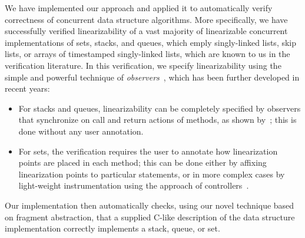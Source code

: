 We have implemented our approach and applied it to automatically verify
correctness of concurrent data structure algorithms.
More specifically, we have successfully verified linearizability of 
a vast majority of linearizable concurrent implementations
of sets, stacks, and queues, which emply singly-linked lists, skip lists, or
arrays of timestamped singly-linked lists, which are known to us in
the verification literature. In this verification, we specify linearizability
using the simple and powerful technique of
{\em observers}~\cite{AHHR:integrated}, which has been further developed in
recent years:
\begin{itemize}
\item
  For stacks and queues, linearizability can be completely specified by
  observers that synchronize on call and return actions of
  methods, as shown by~\cite{BEEH:icalp15,HSV:concur13}; this is done without
 any user annotation.
\item
  For sets, the verification requires the user to annotate how linearization
  points are placed in each method; this can be done either by affixing
  linearization points to particular statements, or in more complex cases by
  light-weight instrumentation using the approach of
  controllers~\cite{Quy:sas16}.
\end{itemize}
Our implementation then automatically checks, using our novel technique based on
fragment abstraction, that a supplied C-like description of the data structure
implementation correctly implements a stack, queue, or set.


